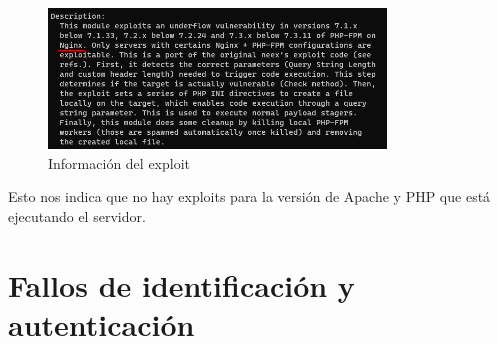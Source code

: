 \documentclass{report}
\begin{document}
                \begin{figure}[H]
                    \centering
                    \includegraphics[width=0.8\textwidth]{./img/vulnerabilidades/2.5/1.3.png}
                    \caption{Información del exploit}
                \end{figure}
                Esto nos indica que no hay exploits para la versión de Apache y PHP que está ejecutando el servidor.\\
                \clearpage
        \section{Fallos de identificación y autenticación}
\end{document}
